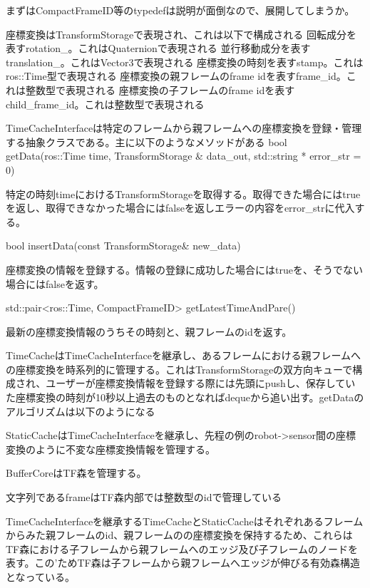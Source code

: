 \documentclass[a4paper]{jreport}	%
\begin{document}
まずはCompactFrameID等のtypedefは説明が面倒なので、展開してしまうか。


座標変換はTransformStorageで表現され、これは以下で構成される
回転成分を表すrotation\_。これはQuaternionで表現される
並行移動成分を表すtranslation\_。これはVector3で表現される
座標変換の時刻を表すstamp。これはros::Time型で表現される
座標変換の親フレームのframe idを表すframe\_id。これは整数型で表現される
座標変換の子フレームのframe idを表すchild\_frame\_id。これは整数型で表現される

TimeCacheInterfaceは特定のフレームから親フレームへの座標変換を登録・管理する抽象クラスである。主に以下のようなメソッドがある
bool getData(ros::Time time, TransformStorage \& data\_out, std::string * error\_str = 0)

特定の時刻timeにおけるTransformStorageを取得する。取得できた場合にはtrueを返し、取得できなかった場合にはfalseを返しエラーの内容をerror\_strに代入する。

bool insertData(const TransformStorage\& new\_data)

座標変換の情報を登録する。情報の登録に成功した場合にはtrueを、そうでない場合にはfalseを返す。

std::pair<ros::Time, CompactFrameID> getLatestTimeAndPare()

最新の座標変換情報のうちその時刻と、親フレームのidを返す。


TimeCacheはTimeCacheInterfaceを継承し、あるフレームにおける親フレームへの座標変換を時系列的に管理する。これはTransformStorageの双方向キューで構成され、ユーザーが座標変換情報を登録する際には先頭にpushし、保存していた座標変換の時刻が10秒以上過去のものとなればdequeから追い出す。getDataのアルゴリズムは以下のようになる






StaticCacheはTimeCacheInterfaceを継承し、先程の例のrobot->sensor間の座標変換のように不変な座標変換情報を管理する。


BufferCoreはTF森を管理する。

文字列であるframeはTF森内部では整数型のidで管理している

TimeCacheInterfaceを継承するTimeCacheとStaticCacheはそれぞれあるフレームからみた親フレームのid、親フレームのの座標変換を保持するため、これらはTF森における子フレームから親フレームへのエッジ及び子フレームのノードを表す。この’ためTF森は子フレームから親フレームへエッジが伸びる有効森構造となっている。
\end{document}
